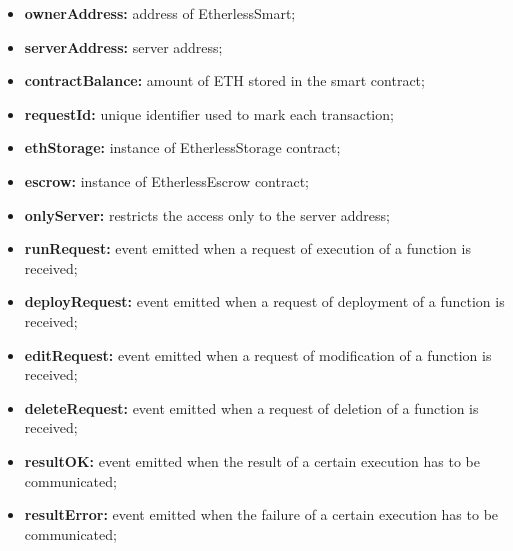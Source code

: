 	\begin{itemize}
		\item \textbf{ownerAddress:} address of EtherlessSmart;
		\item \textbf{serverAddress:} server address;
		\item \textbf{contractBalance:} amount of ETH stored in the smart contract;
		\item \textbf{requestId:} unique identifier used to mark each transaction;
		\item \textbf{ethStorage:} instance of EtherlessStorage contract;
		\item \textbf{escrow:} instance of EtherlessEscrow contract;
	\end{itemize}
	\begin{itemize}
		\item \textbf{onlyServer:} restricts the access only to the server address;
	\end{itemize}
	\begin{itemize}
		\item \textbf{runRequest:} event emitted when a request of execution of a function is received;
		\item \textbf{deployRequest:} event emitted when a request of deployment of a function is received;
		\item \textbf{editRequest:} event emitted when a request of modification of a function is received;
		\item \textbf{deleteRequest:} event emitted when a request of deletion of a function is received;
		\item \textbf{resultOK:} event emitted when the result of a certain execution has to be communicated;
		\item \textbf{resultError:} event emitted when the failure of a certain execution has to be communicated;
	\end{itemize}
